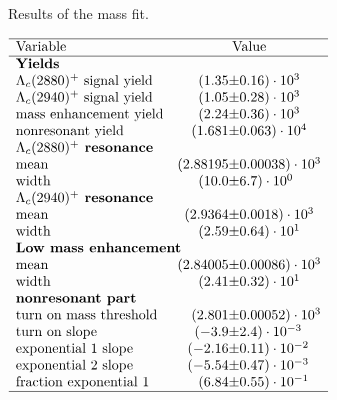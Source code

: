  
\begin{table}[h]
    \centering
    \caption{Results of the \Dz\proton mass fit.}
    \label{tab:fit_mD0p_RS}
    $\begin{array}{lr@{\pm}l}
    \hline
    \text{Variable} & \multicolumn{2}{c}{\text{Value}} \\
    \hline
        \multicolumn{3}{l}{\text{\textbf{Yields}}} \\
\text{\LcResI signal yield}&(1.35 & 0.16) \cdot 10^{3}\\
\text{\LcResII signal yield}&(1.05 & 0.28) \cdot 10^{3}\\
\text{mass enhancement yield}&(2.24 & 0.36) \cdot 10^{3}\\
\text{nonresonant yield}&(1.681 & 0.063) \cdot 10^{4}\\
\multicolumn{3}{l}{\text{\textbf{\LcResI resonance}}} \\
\text{mean}&(2.88195 & 0.00038) \cdot 10^{3}\\
\text{width}&(10.0 & 6.7) \cdot 10^{0}\\
\multicolumn{3}{l}{\text{\textbf{\LcResII resonance}}} \\
\text{mean}&(2.9364 & 0.0018) \cdot 10^{3}\\
\text{width}&(2.59 & 0.64) \cdot 10^{1}\\
\multicolumn{3}{l}{\text{\textbf{Low mass enhancement}}} \\
\text{mean}&(2.84005 & 0.00086) \cdot 10^{3}\\
\text{width}&(2.41 & 0.32) \cdot 10^{1}\\
\multicolumn{3}{l}{\text{\textbf{nonresonant part}}} \\
\text{turn on mass threshold}&(2.801 & 0.00052) \cdot 10^{3}\\
\text{turn on slope}&(-3.9 & 2.4) \cdot 10^{-3}\\
\text{exponential 1 slope}&(-2.16 & 0.11) \cdot 10^{-2}\\
\text{exponential 2 slope}&(-5.54 & 0.47) \cdot 10^{-3}\\
\text{fraction exponential 1}&(6.84 & 0.55) \cdot 10^{-1}\\

\hline
\end{array}$
\end{table}
    